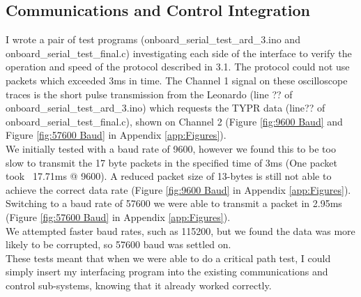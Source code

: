 \documentclass[a4paper,11pt]{article}
\begin{document}
\subsection{Communications and Control Integration}
I wrote a pair of test programs (onboard\_serial\_test\_ard\_3.ino and onboard\_serial\_test\_final.c) investigating each side of the interface to verify the operation and speed of the protocol described in 3.1. The protocol could not use packets which exceeded 3ms in time. The Channel 1 signal on these oscilloscope traces is the short pulse transmission from the Leonardo (line ?? of onboard\_serial\_test\_ard\_3.ino) which requests the TYPR data (line?? of onboard\_serial\_test\_final.c), shown on Channel 2 (Figure \ref{fig:9600 Baud} and Figure \ref{fig:57600 Baud} in Appendix \ref{app:Figures}).  \\
We initially tested with a baud rate of 9600, however we found this to be too slow to transmit the 17 byte packets in the specified time of 3ms (One packet took ~17.71ms @ 9600). A reduced packet size of 13-bytes is still not able to achieve the correct data rate (Figure \ref{fig:9600 Baud} in Appendix \ref{app:Figures}). 
Switching to a baud rate of 57600 we were able to transmit a packet in 2.95ms (Figure \ref{fig:57600 Baud} in Appendix \ref{app:Figures}).\\
We attempted faster baud rates, such as 115200, but we found the data was more likely to be corrupted, so 57600 baud was settled on.\\
These tests meant that when we were able to do a critical path test, I could simply insert my interfacing program into the existing communications and control sub-systems, knowing that it already worked correctly.
\end{document}
